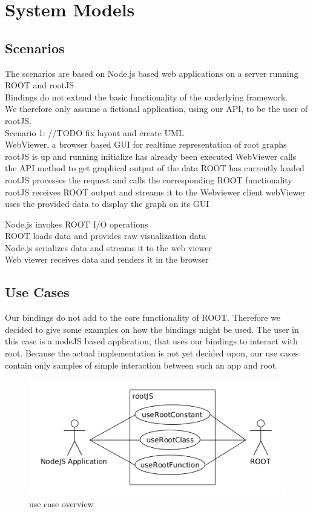 \chapter{System Models}

\section{Scenarios}
The scenarios are based on Node.js based web applications on a server running ROOT and rootJS\\
Bindings do not extend the basic functionality of the underlying framework.\\
We therefore only assume a fictional application, using our API, to be the user of rootJS.\\


Scenario 1: //TODO fix layout and create UML\\
WebViewer, a browser based GUI for realtime representation of root graphs
	rootJS is up and running initialize has already been executed
	WebViewer calls the API method to get graphical output of the data ROOT has currently loaded
	\indent rootJS processes the request and calls the corresponding ROOT functionality
	\indent rootJS receives ROOT output and streams it to the Webviewer client
webViewer uses the provided data to display the graph on its GUI

\indent	Node.js invokes ROOT I/O operations\\
\indent \indent		ROOT loads data and provides raw visualization data\\
\indent	Node.js serializes data and streams it to the web viewer\\
Web viewer receives data and renders it in the browser\\

\section{Use Cases}
Our bindings do not add to the core functionality of ROOT. Therefore 
we decided to give some examples on how the bindings might be used. The 
user in this case is a nodeJS based application, that uses our bindings 
to interact with root. Because the actual implementation is not yet 
decided upon, our use cases contain only samples of simple interaction 
between such an app and root.
\begin{figure}[htb]
	\centering
	\includegraphics[width=18cm]{./latex/resources/usecaseOverview.png}
	\caption{use case overview}
\end{figure}

